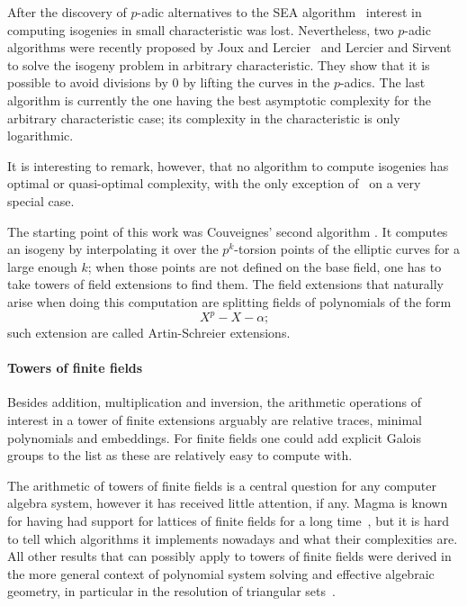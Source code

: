 After the discovery of $p$-adic alternatives to the SEA
algorithm~\cite{satoh00,fouquet+gaudry+harley00} interest in computing
isogenies in small characteristic was lost.  Nevertheless, two
$p$-adic algorithms were recently proposed by Joux and
Lercier~\cite{joux+lercier06} and Lercier and
Sirvent~\cite{lercier+sirvent08} to solve the isogeny problem in
arbitrary characteristic. They show that it is possible to avoid
divisions by $0$ by lifting the curves in the $p$-adics. The last
algorithm is currently the one having the best asymptotic complexity
for the arbitrary characteristic case; its complexity in the
characteristic is only logarithmic.

It is interesting to remark, however, that no algorithm to compute
isogenies has optimal or quasi-optimal complexity, with the only
exception of~\cite{bostan+morain+salvy+schost08} on a very special
case. 

The starting point of this work was Couveignes' second
algorithm \cite{couveignes96}. It computes an isogeny by interpolating
it over the $p^k$-torsion points of the elliptic curves for a large
enough $k$; when those points are not defined on the base field, one
has to take towers of field extensions to find them. The field
extensions that naturally arise when doing this computation are
splitting fields of polynomials of the form
\[X^p - X -\alpha\text{;}\] such extension are called Artin-Schreier
extensions. 


\paragraph*{Towers of finite fields}
Besides addition, multiplication and inversion, the arithmetic
operations of interest in a tower of finite extensions arguably are
relative traces, minimal polynomials and embeddings. For finite fields
one could add explicit Galois groups to the list as these are
relatively easy to compute with.

The arithmetic of towers of finite fields is a central question for
any computer algebra system, however it has received little attention,
if any. Magma is known for having had support for lattices of finite
fields for a long time~\cite{bosma+cannon+steel97}, but it is hard to
tell which algorithms it implements nowadays and what their
complexities are. All other results that can possibly apply to towers
of finite fields were derived in the more general context of
polynomial system solving and effective algebraic geometry, in
particular in the resolution of triangular
sets~\cite{diaz+gonzalez01,giusti+lecerf+salvy01,bostan+salvy+schost03,pascal+schost06,li+moreno+schost07,dahan+jin+moreno+schost08,boulier+lemaire+moreno01,FGLM,rouiller99,alonso+becker+roy+wormann}.

